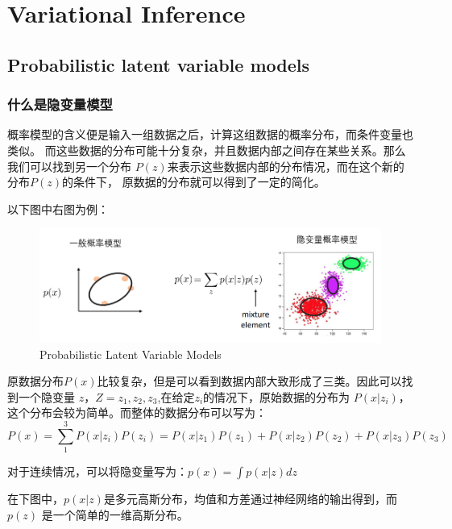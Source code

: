 ﻿

\chapter{Variational Inference}	%

\section{Probabilistic latent variable models} %

\subsection{什么是隐变量模型}

概率模型的含义便是输入一组数据之后，计算这组数据的概率分布，而条件变量也类似。
而这些数据的分布可能十分复杂，并且数据内部之间存在某些关系。那么我们可以找到另一个分布
$P(z)$来表示这些数据内部的分布情况，而在这个新的分布$P(z)$的条件下，
原数据的分布就可以得到了一定的简化。

以下图中右图为例：%

\begin{figure}[!htb]
\centering
\includegraphics[scale=0.6]{pix/probabilistic_1.png}
\caption{Probabilistic Latent Variable Models}
\end{figure}

原数据分布$P(x)$比较复杂，但是可以看到数据内部大致形成了三类。因此可以找到一个隐变量
$z$，$Z=z_1,z_2,z_3$,在给定$z_i$的情况下，原始数据的分布为 $P(x|z_i)$，
这个分布会较为简单。而整体的数据分布可以写为：
$$
P(x)=\sum\limits_1^3P(x|z_i)P(z_i)=P(x|z_1)P(z_1)+P(x|z_2)P(z_2)+P(x|z_3)P(z_3)
$$

对于连续情况，可以将隐变量写为：$p(x)=\int p(x|z)dz$

在下图中，$p(x|z)$是多元高斯分布，均值和方差通过神经网络的输出得到，而$p(z)$
是一个简单的一维高斯分布。

